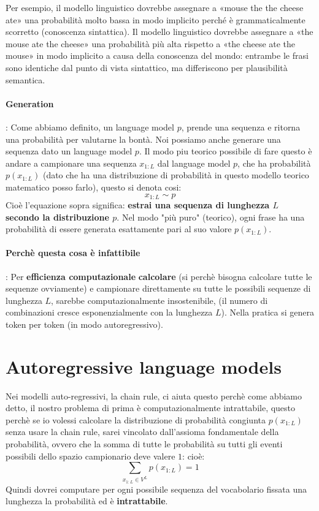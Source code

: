 Per esempio, il modello linguistico dovrebbe assegnare a «mouse the the cheese ate» una probabilità molto bassa in modo implicito
perché è grammaticalmente scorretto (conoscenza sintattica). Il modello linguistico dovrebbe assegnare a «the mouse ate the cheese» 
una probabilità più alta rispetto a «the cheese ate the mouse» in modo implicito a causa della conoscenza del mondo: entrambe le frasi 
sono identiche dal punto di vista sintattico, ma differiscono per plausibilità semantica.
\paragraph{Generation}: Come abbiamo definito, un language model $p$, prende una sequenza e ritorna una probabilità per valutarne la bontà.
Noi possiamo anche generare una sequenza dato un language model $p$.
Il modo piu teorico possibile di fare questo è andare a campionare una sequenza $x_{1:L}$ dal language model $p$, che ha probabilità $p(x_{1:L})$ (dato che ha una distribuzione di probabilità in questo modello teorico matematico posso farlo), questo si denota cosi:
\begin{equation}
    x_{1:L} \sim p
\end{equation}
Cioè l'equazione sopra significa: \textbf{estrai una sequenza di lunghezza $L$ secondo la distribuzione $p$}.
Nel modo "più puro" (teorico), ogni frase ha una probabilità di essere generata esattamente pari al suo valore $p(x_{1:L})$.
\paragraph{Perchè questa cosa è infattibile}:
Per \textbf{efficienza computazionale} \textbf{calcolare} (si perchè bisogna calcolare tutte le sequenze ovviamente) e campionare direttamente su tutte le possibili sequenze di lunghezza $L$, sarebbe
computazionalmente insostenibile, (il numero di combinazioni cresce esponenzialmente con la lunghezza $L$). Nella pratica si genera 
token per token (in modo autoregressivo).
\newpage
\section{Autoregressive language models}
Nei modelli auto-regressivi, la chain rule, ci aiuta questo perchè come abbiamo detto, il nostro problema di prima è computazionalmente intrattabile,
questo perchè se io volessi calcolare la distribuzione di probabilità congiunta $p(x_{1:L})$ senza usare la chain rule, sarei vincolato dall'assioma fondamentale della probabilità, ovvero che la somma di tutte le probabilità su tutti gli eventi possibili dello spazio campionario deve valere $1$:
cioè:
\begin{equation}
    \sum_{x_{1:L} \in V^L} p(x_{1:L}) = 1
\end{equation}
Quindi dovrei computare per ogni possibile sequenza del vocabolario fissata una lunghezza la probabilità ed è \textbf{intrattabile}.


